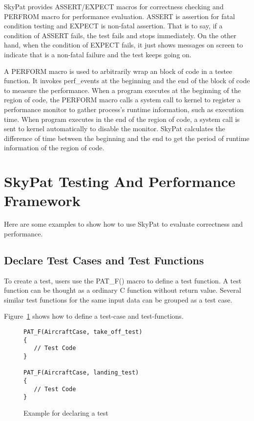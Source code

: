 \documentclass[final]{ols}
\begin{document}
SkyPat provides ASSERT/EXPECT macros for correctness checking and PERFROM macro for performance evaluation.
ASSERT is assertion for fatal condition testing and EXPECT is non-fatal assertion.
That is to say, if a condition of ASSERT fails, the test fails and stops immediately.
On the other hand, when the condition of EXPECT fails, it just shows messages on screen to indicate that is a non-fatal failure and the test keeps going on.

A PERFORM macro is used to arbitrarily wrap an block of code in a testee function.
It invokes perf\_events at the beginning and the end of the block of code to measure the performance.
When a program executes at the beginning of the region of code, the PERFORM macro calls a system call to kernel to register a performance monitor to gather process's runtime information, such as execution time.
When program executes in the end of the region of code, a system call is sent to kernel automatically to disable the monitor.
SkyPat calculates the difference of time between the beginning and the end to get the period of runtime information of the region of code.

\section{SkyPat Testing And Performance Framework}

Here are some examples to show how to use SkyPat to evaluate correctness and performance.

\subsection{Declare Test Cases and Test Functions}

To create a test, users use the PAT\_F() macro to define a test function.
A test function can be thought as a ordinary C function without return value.
Several similar test functions for the same input data can be grouped as a test case.

Figure~\ref{aircraftcase} shows how to define a test-case and test-functions.

\begin{figure}[h]
\lstset{language=C++}
\begin{lstlisting}[frame=single]
PAT_F(AircraftCase, take_off_test)
{
   // Test Code
}

PAT_F(AircraftCase, landing_test)
{
   // Test Code
}
\end{lstlisting}
\caption{Example for declaring a test}
\label{aircraftcase}
\end{figure}
\end{document}
